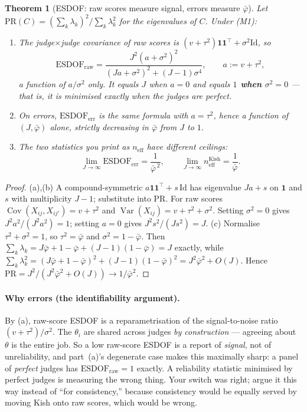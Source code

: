 \documentclass[11pt]{article}
\theoremstyle{plain}
\newtheorem{theorem}{Theorem}
\theoremstyle{definition}
\theoremstyle{remark}
\newcommand{\Var}{\operatorname{Var}}
\newcommand{\Cov}{\operatorname{Cov}}
\newcommand{\pb}{\bar{\varphi}}
\newcommand{\neff}{n_{\mathrm{eff}}}
\begin{document}
\begin{theorem}[ESDOF: raw scores measure signal, errors measure $\pb$]\label{thm:esdof}
Let $\mathrm{PR}(C)=(\sum_k\lambda_k)^2/\sum_k\lambda_k^2$ for the eigenvalues of $C$. Under
\textup{(M1)}:
\begin{enumerate}
\item[(a)] The judge$\times$judge covariance of \emph{raw scores} is
$(v+\tau^2)\mathbf{1}\mathbf{1}^{\!\top}+\sigma^2 \mathrm{Id}$, so
\[
\mathrm{ESDOF}_{\mathrm{raw}}=\frac{J^2(a+\sigma^2)^2}{(Ja+\sigma^2)^2+(J-1)\sigma^4},
\qquad a:=v+\tau^2,
\]
a function of $a/\sigma^2$ only. It equals $J$ when $a=0$ and equals \textbf{$1$ when
$\sigma^2=0$} --- that is, it is \emph{minimised exactly when the judges are perfect}.
\item[(b)] On errors, $\mathrm{ESDOF}_{\mathrm{err}}$ is the same formula with $a=\tau^2$, hence
a function of $(J,\pb)$ alone, strictly decreasing in $\pb$ from $J$ to $1$.
\item[(c)] The two statistics you print as $\neff$ have different ceilings:
\[
\lim_{J\to\infty}\mathrm{ESDOF}_{\mathrm{err}}=\frac{1}{\pb^{\,2}},
\qquad
\lim_{J\to\infty}\neff^{\mathrm{Kish}}=\frac{1}{\pb}.
\]
\end{enumerate}
\end{theorem}

\begin{proof}
(a),(b) A compound-symmetric $a\mathbf{1}\mathbf{1}^{\!\top}+s\,\mathrm{Id}$ has eigenvalue
$Ja+s$ on $\mathbf{1}$ and $s$ with multiplicity $J-1$; substitute into $\mathrm{PR}$. For raw
scores $\Cov(X_{ij},X_{ij'})=v+\tau^2$ and $\Var(X_{ij})=v+\tau^2+\sigma^2$. Setting $\sigma^2=0$
gives $J^2a^2/(J^2a^2)=1$; setting $a=0$ gives $J^2s^2/(Js^2)=J$. (c) Normalise
$\tau^2+\sigma^2=1$, so $\tau^2=\pb$ and $\sigma^2=1-\pb$. Then $\sum_k\lambda_k=J\pb+1-\pb+
(J-1)(1-\pb)=J$ exactly, while
$\sum_k\lambda_k^2=(J\pb+1-\pb)^2+(J-1)(1-\pb)^2 = J^2\pb^2+O(J)$. Hence
$\mathrm{PR}=J^2/(J^2\pb^2+O(J))\to 1/\pb^2$.
\end{proof}

\paragraph{Why errors (the identifiability argument).} By (a), raw-score ESDOF is a
reparametrisation of the signal-to-noise ratio $(v+\tau^2)/\sigma^2$. The $\theta_i$ are shared
across judges \emph{by construction} --- agreeing about $\theta$ is the entire job. So a low
raw-score ESDOF is a report of \emph{signal}, not of unreliability, and part~(a)'s degenerate case
makes this maximally sharp: a panel of \emph{perfect} judges has $\mathrm{ESDOF}_{\mathrm{raw}}=1$
exactly. A reliability statistic minimised by perfect judges is measuring the wrong thing. Your
switch was right; argue it this way instead of ``for consistency,'' because consistency would be
equally served by moving Kish onto raw scores, which would be wrong.
\end{document}
